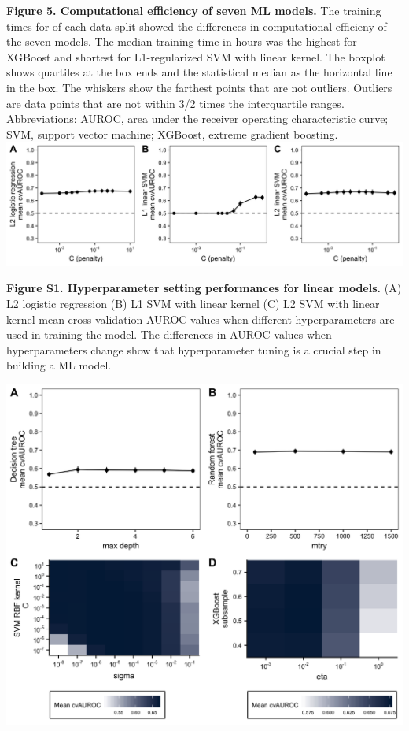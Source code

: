 \documentclass[11pt,]{article}
\begin{document}
\textbf{Figure 5. Computational efficiency of seven ML models.} The
training times for of each data-split showed the differences in
computational efficieny of the seven models. The median training time in
hours was the highest for XGBoost and shortest for L1-regularized SVM
with linear kernel. The boxplot shows quartiles at the box ends and the
statistical median as the horizontal line in the box. The whiskers show
the farthest points that are not outliers. Outliers are data points that
are not within 3/2 times the interquartile ranges. Abbreviations: AUROC,
area under the receiver operating characteristic curve; SVM, support
vector machine; XGBoost, extreme gradient boosting.\\
\newpage
\includegraphics{Figure_S1.png}

\textbf{Figure S1. Hyperparameter setting performances for linear
models.} (A) L2 logistic regression (B) L1 SVM with linear kernel (C) L2
SVM with linear kernel mean cross-validation AUROC values when different
hyperparameters are used in training the model. The differences in AUROC
values when hyperparameters change show that hyperparameter tuning is a
crucial step in building a ML model.

\newpage

\includegraphics{Figure_S2.png}
\end{document}
